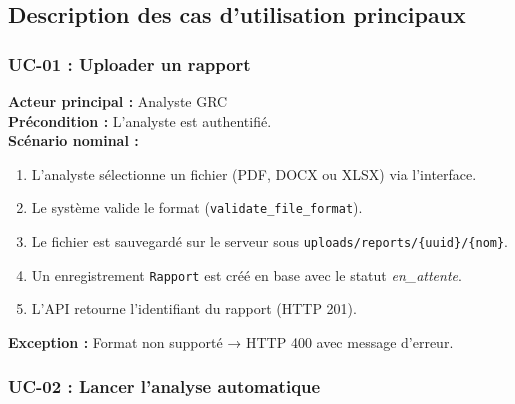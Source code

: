 \subsection{Description des cas d'utilisation principaux}

\subsubsection*{UC-01 : Uploader un rapport}

\begin{tcolorbox}[colback=lightgray!20, colframe=darknavy, title=UC-01 — Uploader un rapport]
\textbf{Acteur principal :} Analyste GRC \\
\textbf{Précondition :} L'analyste est authentifié. \\
\textbf{Scénario nominal :}
\begin{enumerate}
  \item L'analyste sélectionne un fichier (PDF, DOCX ou XLSX) via l'interface.
  \item Le système valide le format (\texttt{validate\_file\_format}).
  \item Le fichier est sauvegardé sur le serveur sous
        \texttt{uploads/reports/\{uuid\}/\{nom\}}.
  \item Un enregistrement \texttt{Rapport} est créé en base avec le statut
        \textit{en\_attente}.
  \item L'API retourne l'identifiant du rapport (HTTP 201).
\end{enumerate}
\textbf{Exception :} Format non supporté → HTTP 400 avec message d'erreur.
\end{tcolorbox}

\subsubsection*{UC-02 : Lancer l'analyse automatique}


